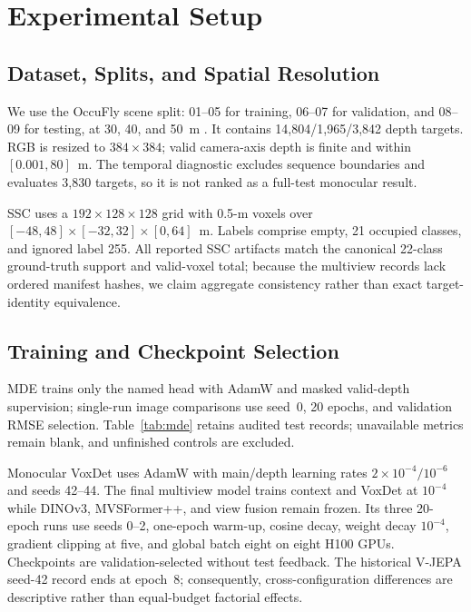 
\section{Experimental Setup}
\label{sec:setup}

\subsection{Dataset, Splits, and Spatial Resolution}
We use the OccuFly scene split: 01--05 for training, 06--07 for validation, and 08--09 for testing, at 30, 40, and 50~m \cite{gross2026occufly}. It contains 14,804/1,965/3,842 depth targets. RGB is resized to $384\times384$; valid camera-axis depth is finite and within $[0.001,80]$~m. The temporal diagnostic excludes sequence boundaries and evaluates 3,830 targets, so it is not ranked as a full-test monocular result.

SSC uses a $192\times128\times128$ grid with 0.5-m voxels over $[-48,48]\times[-32,32]\times[0,64]$~m. Labels comprise empty, 21 occupied classes, and ignored label 255. All reported SSC artifacts match the canonical 22-class ground-truth support and valid-voxel total; because the multiview records lack ordered manifest hashes, we claim aggregate consistency rather than exact target-identity equivalence.

\subsection{Training and Checkpoint Selection}
MDE trains only the named head with AdamW and masked valid-depth supervision; single-run image comparisons use seed~0, 20 epochs, and validation RMSE selection. Table~\ref{tab:mde} retains audited test records; unavailable metrics remain blank, and unfinished controls are excluded.

Monocular VoxDet uses AdamW with main/depth learning rates $2\times10^{-4}/10^{-6}$ and seeds 42--44. The final multiview model trains context and VoxDet at $10^{-4}$ while DINOv3, MVSFormer++, and view fusion remain frozen. Its three 20-epoch runs use seeds 0--2, one-epoch warm-up, cosine decay, weight decay $10^{-4}$, gradient clipping at five, and global batch eight on eight H100 GPUs. Checkpoints are validation-selected without test feedback. The historical V-JEPA seed-42 record ends at epoch~8; consequently, cross-configuration differences are descriptive rather than equal-budget factorial effects.

